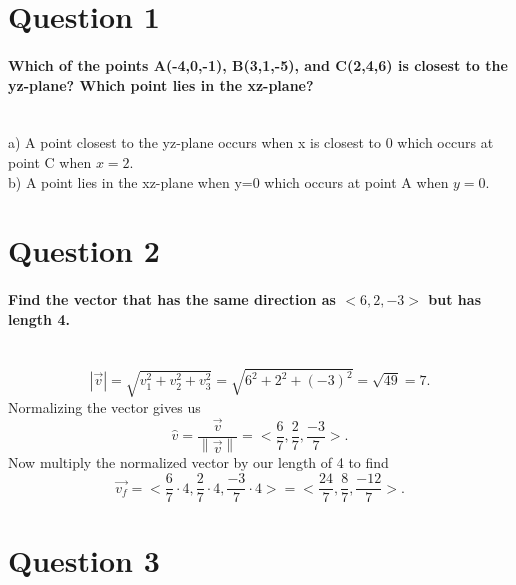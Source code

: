 \section{Question 1}%
\label{sec:Question 1}

\paragraph{Which of the points A(-4,0,-1), B(3,1,-5), and C(2,4,6) is closest to the yz-plane? Which point lies in the xz-plane? \\ \\} 

a) A point closest to the yz-plane occurs when x is closest to 0 which occurs at point C when $ x=2 $. \\

b) A point lies in the xz-plane when y=0 which occurs at point A when $ y=0 $.

\section{Question 2}%
\label{sec: Question 2 }

\paragraph{Find the vector that has the same direction as $ < 6,2,-3 > $ but has length 4. \\ \\}

\[
	\left| \vec{v} \right| = \sqrt{ v_1^2+v_2^2+v_3^2 } = \sqrt{ 6^2+2^2+(-3)^2 } = \sqrt{ 49 } = 7
.\] 
Normalizing the vector gives us
\[
\hat{ v } = \frac{ \vec{{v}}}{ \left\| \vec{{ v }} {} \right\| } = < \frac{ 6 }{ 7 }, \frac{ 2 }{ 7 }, \frac{ -3 }{ 7 } >
.\] 
Now multiply the normalized vector by our length of 4 to find
\[
	\vec{{ v_f }} = < \frac{ 6 }{ 7 } \cdot 4, \frac{ 2 }{ 7 } \cdot 4, \frac{ -3 }{ 7 } \cdot 4 > = < \frac{ 24 }{ 7 }, \frac{ 8 }{ 7 }, \frac{ -12 }{ 7 } >
.\] 

\section{Question 3}%
\label{sec: Question 3 }
